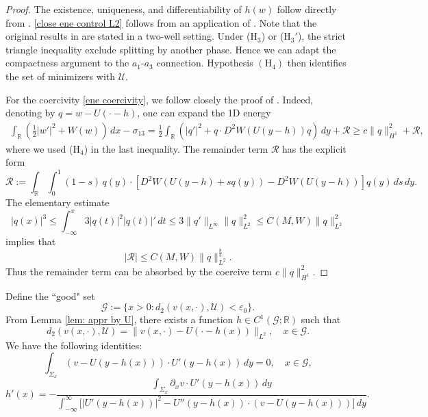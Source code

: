 \documentclass[leqno,11pt]{amsart}
\let\pa=\partial
\let\f=\frac
\let\S=\Sigma
\let\e=\varepsilon
\let\pa=\partial
\theoremstyle{remark}
\newcommand{\BR}{\mathbb{R}}
\begin{document}
\begin{proof}
The existence, uniqueness, and differentiability of $h(w)$ follow directly from \cite[Lemma 2.1]{schatzman2002asymmetric}. \eqref{close ene control L2} follows from an application of \cite[Theorem 3.1 and Corollary 3.2]{schatzman2002asymmetric}. Note that the original results in \cite{schatzman2002asymmetric} are stated in a two-well setting. Under ($\mathrm{H}_3$) or ($\mathrm{H}_3'$), the strict triangle inequality exclude splitting by another phase. Hence we can adapt the compactness argument to the $a_1$-$a_3$ connection. Hypothesis $(\mathrm H_4)$ then identifies the set of minimizers with $\mathcal U$.

For the coercivity \eqref{ene coercivity}, we follow closely the proof of \cite[Lemma~4.5]{schatzman2002asymmetric}. Indeed, denoting by $q=w-U(\cdot-h)$, one can expand the 1D energy 
\begin{align*}
\int_\BR\left(\f12|w'|^2+W(w)\right)\,dx-\sigma_{13}
 =\frac12\int_\BR
 \left(|q'|^2+q\cdot D^2W(U(y-h))q\right)\,dy
 +\mathcal{R}\geq c\|q\|_{H^1}^2+\mathcal{R},  
\end{align*}
where we used ($\mathrm H_4$) in the last inequality. The remainder term $\mathcal{R}$ has the explicit form
\begin{equation*}
   \mathcal{R}:= \int_\BR\int_0^1 (1-s)\,q(y)\cdot \left[D^2W(U(y-h)+sq(y))-D^2W(U(y-h))\right]q(y)\,ds\,dy.
\end{equation*}
The elementary estimate
\begin{equation}\label{L2 control Linfty}
|q(x)|^3\leq \int_{-\infty}^x 3|q(t)|^2|q(t)|'\,dt\leq 3\|q'\|_{L^\infty}\|q\|^2_{L^2}\leq C(M,W)\|q\|^2_{L^2}
\end{equation}
implies that 
\[
|\mathcal{R}|\leq C(M,W) \|q\|_{L^2}^{\f{8}{3}}.
\]
Thus the remainder term can be absorbed by the coercive term $c\|q\|_{H^1}^2$.

\end{proof}

Define the ``good" set
\begin{equation*}
    \mathcal{G}:= \{x>0: d_2(v(x,\cdot),\mathcal{U})< \e_0\}.
\end{equation*}
From  Lemma \ref{lem: appr by U}, there exists a function $h\in C^1(\mathcal{G};\BR)$ such that 
\begin{equation*}
d_2(v(x,\cdot),\mathcal{U})=\|v(x,\cdot)-U(\cdot-h(x))\|_{L^2}, \quad x\in \mathcal{G}.
\end{equation*}
We have the following identities:
    \begin{equation}
        \label{id: orthogonality}
        \int_{\S_x} (v-U(y-h(x)))\cdot U'(y-h(x)) \,dy=0,\quad  x\in \mathcal{G},
    \end{equation}
    \begin{equation}
        \label{id: formula h'(x)}
        h'(x)=-\f{\int_{\S_x} \pa_xv\cdot U'(y-h(x))\,dy}{\int_{-\infty}^\infty\big[ |U'(y-h(x))|^2 - U''(y-h(x))\cdot(v-U(y-h(x)))  \big]  \,dy}.
    \end{equation}
\end{document}
